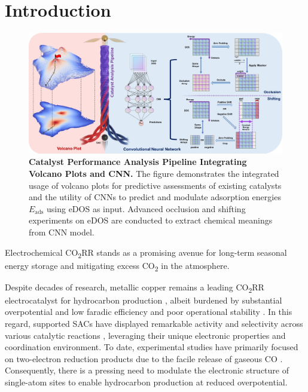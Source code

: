 

\section{Introduction}


\begin{figure}
    \centering
    \includegraphics[width=0.95\linewidth]{main_fig1_pipeline.JPG}
    \caption{\textbf{Catalyst Performance Analysis Pipeline Integrating Volcano Plots and CNN.}
    The figure demonstrates the integrated usage of volcano plots for predictive assessments of existing catalysts and the utility of CNNs to predict and modulate adsorption energies \(E_{\text{ads}}\) using eDOS as input.
    Advanced occlusion and shifting experiments on eDOS are conducted to extract chemical meanings from CNN model.}
    \label{main_fig1:pipeline}
\end{figure}


Electrochemical CO\textsubscript{2}RR stands as a promising avenue for long-term seasonal energy storage \cite{dinh2018co2} and mitigating excess CO\textsubscript{2} in the atmosphere.

Despite decades of research, metallic copper remains a leading CO\textsubscript{2}RR electrocatalyst for hydrocarbon production \cite{osella2023co2}, albeit burdened by substantial overpotential and low faradic efficiency and poor operational stability \cite{chen2019identifying, liu2021co2}.
In this regard, supported SACs have displayed remarkable activity and selectivity across various catalytic reactions \cite{wang2018heterogeneous, yang2018atomically}, leveraging their unique electronic properties and coordination environment.
To date, experimental studies have primarily focused on two-electron reduction products due to the facile release of gaseous CO \cite{cai2021insights, ju2017understanding, ren2019isolated}.
Consequently, there is a pressing need to modulate the electronic structure of single-atom sites to enable hydrocarbon production at reduced overpotential.


